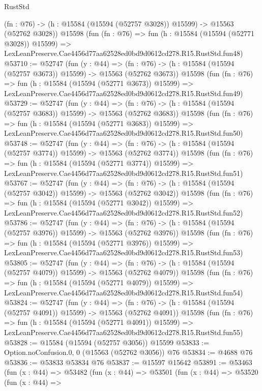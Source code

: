 \begin{lexlean}{RustStd}
\begin{coremodule}
    (fn : @76) -> (h : @15584 (@15594 (@52757 @3028)) @15599) -> @15563 (@52762 @3028))
    @15598
    (fun (fn : @76) =>
    fun (h : @15584 (@15594 (@52771 @3028)) @15599) =>
    LexLeanPreserve.Cae4456d77aa62528ed0bd9d0612cd278.R15.RustStd.fun48)
@53710 := @52747
    (fun (y : @44) =>
    (fn : @76) -> (h : @15584 (@15594 (@52757 @3673)) @15599) -> @15563 (@52762 @3673))
    @15598
    (fun (fn : @76) =>
    fun (h : @15584 (@15594 (@52771 @3673)) @15599) =>
    LexLeanPreserve.Cae4456d77aa62528ed0bd9d0612cd278.R15.RustStd.fun49)
@53729 := @52747
    (fun (y : @44) =>
    (fn : @76) -> (h : @15584 (@15594 (@52757 @3683)) @15599) -> @15563 (@52762 @3683))
    @15598
    (fun (fn : @76) =>
    fun (h : @15584 (@15594 (@52771 @3683)) @15599) =>
    LexLeanPreserve.Cae4456d77aa62528ed0bd9d0612cd278.R15.RustStd.fun50)
@53748 := @52747
    (fun (y : @44) =>
    (fn : @76) -> (h : @15584 (@15594 (@52757 @3774)) @15599) -> @15563 (@52762 @3774))
    @15598
    (fun (fn : @76) =>
    fun (h : @15584 (@15594 (@52771 @3774)) @15599) =>
    LexLeanPreserve.Cae4456d77aa62528ed0bd9d0612cd278.R15.RustStd.fun51)
@53767 := @52747
    (fun (y : @44) =>
    (fn : @76) -> (h : @15584 (@15594 (@52757 @3042)) @15599) -> @15563 (@52762 @3042))
    @15598
    (fun (fn : @76) =>
    fun (h : @15584 (@15594 (@52771 @3042)) @15599) =>
    LexLeanPreserve.Cae4456d77aa62528ed0bd9d0612cd278.R15.RustStd.fun52)
@53786 := @52747
    (fun (y : @44) =>
    (fn : @76) -> (h : @15584 (@15594 (@52757 @3976)) @15599) -> @15563 (@52762 @3976))
    @15598
    (fun (fn : @76) =>
    fun (h : @15584 (@15594 (@52771 @3976)) @15599) =>
    LexLeanPreserve.Cae4456d77aa62528ed0bd9d0612cd278.R15.RustStd.fun53)
@53805 := @52747
    (fun (y : @44) =>
    (fn : @76) -> (h : @15584 (@15594 (@52757 @4079)) @15599) -> @15563 (@52762 @4079))
    @15598
    (fun (fn : @76) =>
    fun (h : @15584 (@15594 (@52771 @4079)) @15599) =>
    LexLeanPreserve.Cae4456d77aa62528ed0bd9d0612cd278.R15.RustStd.fun54)
@53824 := @52747
    (fun (y : @44) =>
    (fn : @76) -> (h : @15584 (@15594 (@52757 @4091)) @15599) -> @15563 (@52762 @4091))
    @15598
    (fun (fn : @76) =>
    fun (h : @15584 (@15594 (@52771 @4091)) @15599) =>
    LexLeanPreserve.Cae4456d77aa62528ed0bd9d0612cd278.R15.RustStd.fun55)
@53828 := @15584 (@15594 (@52757 @3056)) @15599
@53833 := Option.noConfusion.{0, 0} (@15563 (@52762 @3056)) @76
@53834 := @4688 @76
@53836 := @53833 @53834 @76
@53837 := @15597 @15642
@53891 := @53463
    (fun (x : @44) =>
    @53482
      (fun (x : @44) =>
      @53501
        (fun (x : @44) =>
        @53520
          (fun (x : @44) =>

\end{coremodule}
\end{lexlean}

